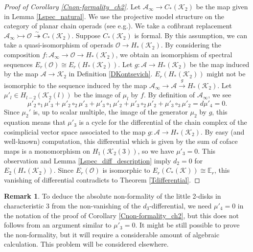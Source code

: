 \documentclass[reqno]{amsart}
\theoremstyle{definition}
\newtheorem{rem}[defi]{Remark}
\theoremstyle{plain}
\newcommand{\oper}{\mathcal{O}}%
\newcommand{\ASS}{\mathcal{A}}%
\newcommand{\KK}{\mathcal{K}}%
\newcommand{\EE}{\mathbb{E}}
\begin{document}
\begin{proof}[Proof of Corollary \ref{Cnon-formality_ch2}]
Let $\ASS_\infty\to C_*(\KK_2)$ be the map given in Lemma \ref{Lspec_natural}. We use the projective model structure on the category of planar chain operads (see e.g.\cite{moriya,tsopmene}). We take a cofibrant replacement $\ASS_\infty\rightarrowtail \oper\stackrel{\sim}{\twoheadrightarrow} C_*(\KK_2)$. 
Suppose  $C_*(\KK_2)$ is formal. By this assumption, we  can take a quasi-isomorphism of operads $\oper\to H_*(\KK_2)$. By considering the composition $f:\ASS_\infty\to \oper\to H_*(\KK_2)$, we obtain an isomorphism of spectral sequences $E_r(\oper)\cong E_r(H_*(\KK_2))$. Let $g:\ASS\to H_*(\KK_2)$ be the map induced by the map $\ASS\to \KK_2$ in Definition \ref{DKontsevich}. $E_r(H_*(\KK_2))$ might not be isomorphic to the sequence induced by the map $\ASS_\infty\to \ASS\stackrel{g}{\to} H_*(\KK_2)$.  Let $\mu'_l\in H_{l-2}(\KK_2(l))$ be the image of $\mu_l$ by $f$. By definition of $\ASS_\infty$, we see 
\[
\mu'_2\circ_1\mu'_3+\mu'_2\circ_2\mu'_3+\mu'_3\circ_1\mu'_2+\mu'_3\circ_2\mu'_2+\mu'_3\circ_3\mu'_2=d\mu'_4=0.
\]
Since $\mu_2'$ is, up to scalar multiple,  the image of the generator $\mu_2$ by $g$, 
this equation means that $\mu'_3$ is a cycle for the differential of the  chain complex of  the cosimplicial vector space associated to the map $g: \ASS\to H_*(\KK_2)$. By easy (and well-known) computation, this differential which is given by the sum of coface maps is a monomorphism on $H_1(\KK_2(3))$, so we have $\mu'_3=0$. This observation and Lemma \ref{Lspec_diff_description} imply $d_2=0$ for $E_2(H_*(\KK_2))$. Since $E_r(\oper)$ is isomorphic to $E_r(C_*(\KK))\cong \EE_r$, this vanishing of differential contradicts to Theorem \ref{Tdifferential}.
\end{proof}
\begin{rem}
To deduce the absolute non-formality of the little 2-disks in characteristic 3 from the non-vanishing of the $d_3$-differential, we need $\mu'_4=0$ in the notation of the proof of Corollary \ref{Cnon-formality_ch2}, but this does not follows from an argument similar to $\mu'_3=0$. It might be still possible to prove the non-formality, but it will require a considerable amount of algebraic calculation. This problem will be considered elsewhere.
\end{rem}
\end{document}
